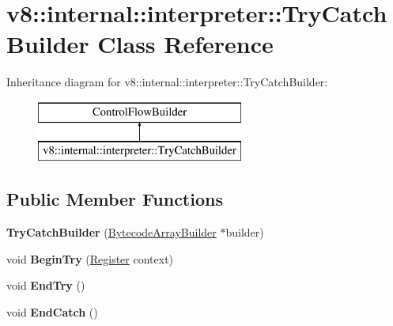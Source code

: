 \hypertarget{classv8_1_1internal_1_1interpreter_1_1_try_catch_builder}{}\section{v8\+:\+:internal\+:\+:interpreter\+:\+:Try\+Catch\+Builder Class Reference}
\label{classv8_1_1internal_1_1interpreter_1_1_try_catch_builder}
Inheritance diagram for v8\+:\+:internal\+:\+:interpreter\+:\+:Try\+Catch\+Builder\+:\begin{figure}[H]
\begin{center}
\leavevmode
\includegraphics[height=2.000000cm]{classv8_1_1internal_1_1interpreter_1_1_try_catch_builder}
\end{center}
\end{figure}
\subsection*{Public Member Functions}
\begin{DoxyCompactItemize}
\item 
{\bfseries Try\+Catch\+Builder} (\hyperlink{classv8_1_1internal_1_1interpreter_1_1_bytecode_array_builder}{Bytecode\+Array\+Builder} $\ast$builder)\hypertarget{classv8_1_1internal_1_1interpreter_1_1_try_catch_builder_a67de6ef6155271b9717d264a230915b7}{}\label{classv8_1_1internal_1_1interpreter_1_1_try_catch_builder_a67de6ef6155271b9717d264a230915b7}

\item 
void {\bfseries Begin\+Try} (\hyperlink{classv8_1_1internal_1_1interpreter_1_1_register}{Register} context)\hypertarget{classv8_1_1internal_1_1interpreter_1_1_try_catch_builder_aca60a78b65213eb139ea8063b779e35a}{}\label{classv8_1_1internal_1_1interpreter_1_1_try_catch_builder_aca60a78b65213eb139ea8063b779e35a}

\item 
void {\bfseries End\+Try} ()\hypertarget{classv8_1_1internal_1_1interpreter_1_1_try_catch_builder_ad0b458d1a6b55141c7ff60f2c4b47282}{}\label{classv8_1_1internal_1_1interpreter_1_1_try_catch_builder_ad0b458d1a6b55141c7ff60f2c4b47282}

\item 
void {\bfseries End\+Catch} ()\hypertarget{classv8_1_1internal_1_1interpreter_1_1_try_catch_builder_ac32fb3b84609c3bf3f8b86dbc43664a6}{}\label{classv8_1_1internal_1_1interpreter_1_1_try_catch_builder_ac32fb3b84609c3bf3f8b86dbc43664a6}

\end{DoxyCompactItemize}

